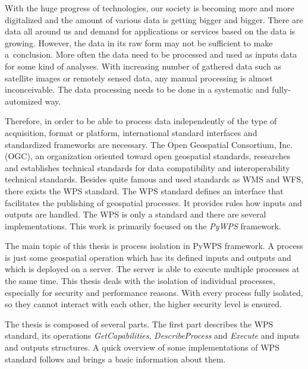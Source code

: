  With the huge progress of technologies, our
society is becoming more and more digitalized and the amount of
various data is getting bigger and bigger. There are data all around
us and demand for applications or services based on the data is
growing. However, the data in its raw form may not be sufficient to
make a~conclusion. More often the data need to be processed and used
as inputs data for some kind of ana\-lyses. With increasing number of
gathered data such as satellite images or remotely sensed data, any
manual processing is almost inconceivable. The data processing needs
to be done in a systematic and fully-automized way.

Therefore, in order to be able to process data independently of the
type of acquisition, format or platform, international standard
interfaces and standardized frameworks are necessary. The Open
Geospatial Consortium, Inc.  (OGC), an organization oriented toward
open geospatial standards, researches and establishes technical
standards for data compatibility and interoperability technical
standards. Besides quite famous and used standards as WMS and WFS,
there exists the WPS standard. The WPS standard defines an interface
that facilitates the publishing of geospatial processes. It provides
rules how inputs and outputs are handled. The WPS is only a standard
and there are several implementations. This work is primarily focused
on the \textit{PyWPS} framework.

\bigskip
The main topic of this thesis is process isolation in PyWPS framework. A process is just some geospatial operation which 
has its defined inputs and outputs and which is deployed on a server. The server is able to execute multiple 
processes at the same time. This thesis deals with the isolation of individual processes, especially for security and 
performance reasons. With every process fully isolated, so they cannot interact with each other, the higher security 
level is ensured.

The thesis is composed of several parts. The first part describes the WPS standard, its operations 
\textit{GetCapabilities}, \textit{DescribeProcess} and \textit{Execute} and inputs and outputs structures. A quick
overview of some implementations of WPS standard follows and brings a basic information about them.

